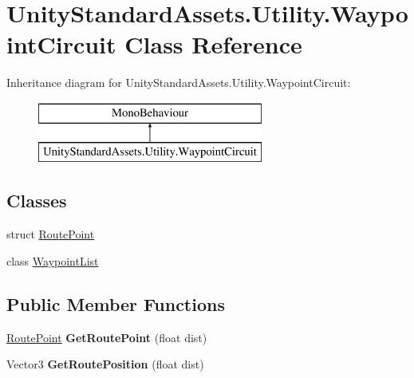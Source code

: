 \hypertarget{class_unity_standard_assets_1_1_utility_1_1_waypoint_circuit}{}\section{Unity\+Standard\+Assets.\+Utility.\+Waypoint\+Circuit Class Reference}
\label{class_unity_standard_assets_1_1_utility_1_1_waypoint_circuit}
Inheritance diagram for Unity\+Standard\+Assets.\+Utility.\+Waypoint\+Circuit\+:\begin{figure}[H]
\begin{center}
\leavevmode
\includegraphics[height=2.000000cm]{class_unity_standard_assets_1_1_utility_1_1_waypoint_circuit}
\end{center}
\end{figure}
\subsection*{Classes}
\begin{DoxyCompactItemize}
\item 
struct \hyperlink{struct_unity_standard_assets_1_1_utility_1_1_waypoint_circuit_1_1_route_point}{Route\+Point}
\item 
class \hyperlink{class_unity_standard_assets_1_1_utility_1_1_waypoint_circuit_1_1_waypoint_list}{Waypoint\+List}
\end{DoxyCompactItemize}
\subsection*{Public Member Functions}
\begin{DoxyCompactItemize}
\item 
\mbox{\label{class_unity_standard_assets_1_1_utility_1_1_waypoint_circuit_aac0437d6b641a9dd1cb32db4170a115f}} 
\hyperlink{struct_unity_standard_assets_1_1_utility_1_1_waypoint_circuit_1_1_route_point}{Route\+Point} {\bfseries Get\+Route\+Point} (float dist)
\item 
\mbox{\label{class_unity_standard_assets_1_1_utility_1_1_waypoint_circuit_a7f3f7803b415864a93ae5c51829a2bcd}} 
Vector3 {\bfseries Get\+Route\+Position} (float dist)
\end{DoxyCompactItemize}
